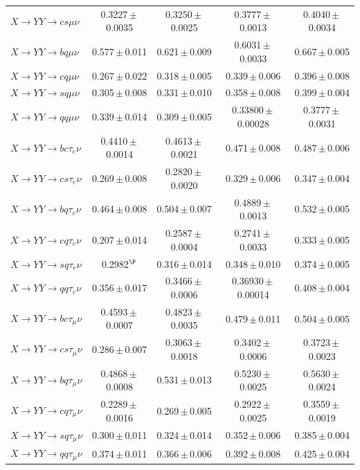 \begin{landscape}
{\begin{longtable}{@{\extracolsep{\fill}}lcccc@{}}
$X\to YY\to cs\mu\nu$ & 0.3227\,$\pm$\,0.0035 & 0.3250\,$\pm$\,0.0025 & 0.3777\,$\pm$\,0.0013 & 0.4040\,$\pm$\,0.0034 \\
$X\to YY\to bq\mu\nu$ & 0.577\,$\pm$\,0.011 & 0.621\,$\pm$\,0.009 & 0.6031\,$\pm$\,0.0033 & 0.667\,$\pm$\,0.005 \\
$X\to YY\to cq\mu\nu$ & 0.267\,$\pm$\,0.022 & 0.318\,$\pm$\,0.005 & 0.339\,$\pm$\,0.006 & 0.396\,$\pm$\,0.008 \\
$X\to YY\to sq\mu\nu$ & 0.305\,$\pm$\,0.008 & 0.331\,$\pm$\,0.010 & 0.358\,$\pm$\,0.008 & 0.399\,$\pm$\,0.004 \\
$X\to YY\to qq\mu\nu$ & 0.339\,$\pm$\,0.014 & 0.309\,$\pm$\,0.005 & 0.33800\,$\pm$\,0.00028 & 0.3777\,$\pm$\,0.0031 \\
\midrule
$X\to YY\to bc\tau_e\nu$ & 0.4410\,$\pm$\,0.0014 & 0.4613\,$\pm$\,0.0021 & 0.471\,$\pm$\,0.008 & 0.487\,$\pm$\,0.006 \\
$X\to YY\to cs\tau_e\nu$ & 0.269\,$\pm$\,0.008 & 0.2820\,$\pm$\,0.0020 & 0.329\,$\pm$\,0.006 & 0.347\,$\pm$\,0.004 \\
$X\to YY\to bq\tau_e\nu$ & 0.464\,$\pm$\,0.008 & 0.504\,$\pm$\,0.007 & 0.4889\,$\pm$\,0.0013 & 0.532\,$\pm$\,0.005 \\
$X\to YY\to cq\tau_e\nu$ & 0.207\,$\pm$\,0.014 & 0.2587\,$\pm$\,0.0004 & 0.2741\,$\pm$\,0.0033 & 0.333\,$\pm$\,0.005 \\
$X\to YY\to sq\tau_e\nu$ & 0.2982$^{\P}$ & 0.316\,$\pm$\,0.014 & 0.348\,$\pm$\,0.010 & 0.374\,$\pm$\,0.005 \\
$X\to YY\to qq\tau_e\nu$ & 0.356\,$\pm$\,0.017 & 0.3466\,$\pm$\,0.0006 & 0.36930\,$\pm$\,0.00014 & 0.408\,$\pm$\,0.004 \\
$X\to YY\to bc\tau_\mu\nu$ & 0.4593\,$\pm$\,0.0007 & 0.4823\,$\pm$\,0.0035 & 0.479\,$\pm$\,0.011 & 0.504\,$\pm$\,0.005 \\
$X\to YY\to cs\tau_\mu\nu$ & 0.286\,$\pm$\,0.007 & 0.3063\,$\pm$\,0.0018 & 0.3402\,$\pm$\,0.0006 & 0.3723\,$\pm$\,0.0023 \\
$X\to YY\to bq\tau_\mu\nu$ & 0.4868\,$\pm$\,0.0008 & 0.531\,$\pm$\,0.013 & 0.5230\,$\pm$\,0.0025 & 0.5630\,$\pm$\,0.0024 \\
$X\to YY\to cq\tau_\mu\nu$ & 0.2289\,$\pm$\,0.0016 & 0.269\,$\pm$\,0.005 & 0.2922\,$\pm$\,0.0025 & 0.3559\,$\pm$\,0.0019 \\
$X\to YY\to sq\tau_\mu\nu$ & 0.300\,$\pm$\,0.011 & 0.324\,$\pm$\,0.014 & 0.352\,$\pm$\,0.006 & 0.385\,$\pm$\,0.004 \\
$X\to YY\to qq\tau_\mu\nu$ & 0.374\,$\pm$\,0.011 & 0.366\,$\pm$\,0.006 & 0.392\,$\pm$\,0.008 & 0.425\,$\pm$\,0.004 \\

\end{longtable}}
\end{landscape}
